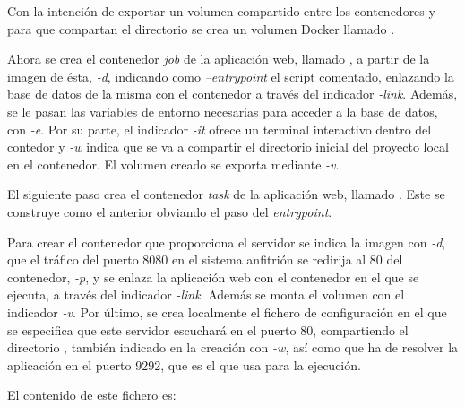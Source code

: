 Con la intención de exportar un volumen compartido entre los contenedores  y  para que compartan el directorio  se crea un volumen Docker llamado .

Ahora se crea el contenedor \textit{job} de la aplicación web, llamado , a partir de la imagen de ésta, \textit{\--d}, indicando como \textit{\---entrypoint} el script comentado, enlazando la base de datos de la misma con el contenedor  a través del indicador \textit{\--link}. Además, se le pasan las variables de entorno necesarias para acceder a la base de datos, con \textit{\--e}. Por su parte, el indicador \textit{\--it} ofrece un terminal interactivo dentro del contedor y \textit{\--w} indica que se va a compartir el directorio inicial del proyecto local en el contenedor. El volumen creado se exporta mediante \textit{\--v}.

El siguiente paso crea el contenedor \textit{task} de la aplicación web, llamado . Este se construye como el anterior obviando el paso del \textit{entrypoint}.

Para crear el contenedor  que proporciona el servidor  se indica la imagen con \textit{\--d}, que el tráfico del puerto 8080 en el sistema anfitrión se redirija al 80 del contenedor, \textit{\--p}, y se enlaza la aplicación web con el contenedor en el que se ejecuta, a través del indicador \textit{\--link}. Además se monta el volumen  con el indicador \textit{\--v}. Por último, se crea localmente el fichero de configuración  en el que se especifica que este servidor escuchará en el puerto 80, compartiendo el directorio , también indicado en la creación con \textit{\--w}, así como que ha de resolver la aplicación en el puerto 9292, que es el que usa  para la ejecución.  

El contenido de este fichero es: 
\begin{codelisting}
\label{code:nginxconf}
\end{codelisting}

